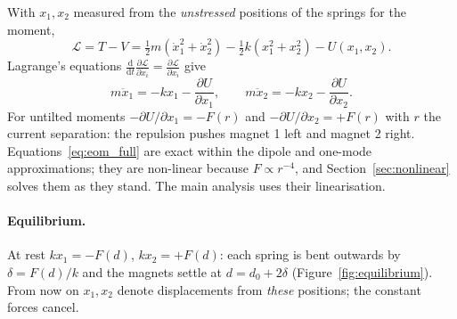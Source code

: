 \documentclass[11pt,a4paper]{article}
\newcommand{\dd}{\mathrm{d}}
\newcommand{\Lag}{\mathcal L}
\begin{document}
With $x_1,x_2$ measured from the \emph{unstressed} positions of the springs for the moment,
\begin{equation}
\Lag=T-V=\tfrac12 m(\dot x_1^2+\dot x_2^2)-\tfrac12 k(x_1^2+x_2^2)-U(x_1,x_2).
\label{eq:L}
\end{equation}
Lagrange's equations $\frac{\dd}{\dd t}\frac{\partial\Lag}{\partial\dot x_i}=\frac{\partial\Lag}{\partial x_i}$ give
\begin{equation}
m\ddot x_1=-kx_1-\frac{\partial U}{\partial x_1},\qquad m\ddot x_2=-kx_2-\frac{\partial U}{\partial x_2}.
\label{eq:eom_full}
\end{equation}
For untilted moments $-\partial U/\partial x_1=-F(r)$ and $-\partial U/\partial x_2=+F(r)$ with $r$ the current separation: the repulsion pushes magnet 1 left and magnet 2 right. Equations~\eqref{eq:eom_full} are exact within the dipole and one-mode approximations; they are non-linear because $F\propto r^{-4}$, and Section~\ref{sec:nonlinear} solves them as they stand. The main analysis uses their linearisation.

\paragraph{Equilibrium.} At rest $kx_1=-F(d)$, $kx_2=+F(d)$: each spring is bent outwards by $\delta=F(d)/k$ and the magnets settle at $d=d_0+2\delta$ (Figure~\ref{fig:equilibrium}). From now on $x_1,x_2$ denote displacements from \emph{these} positions; the constant forces cancel.
\end{document}
